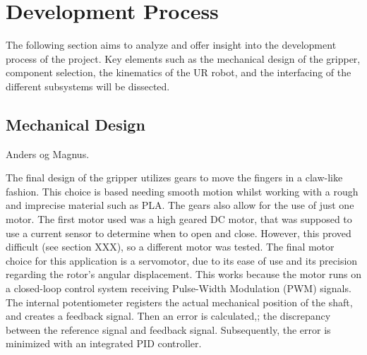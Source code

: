 \section{Development Process}

The following section aims to analyze and offer insight into the development process of the project. Key elements such as the mechanical design of the gripper, component selection, the kinematics of the UR robot, and the interfacing of the different subsystems will be dissected. 

\subsection{Mechanical Design} 
Anders og Magnus.

The final design of the gripper utilizes gears to move the fingers in a claw-like fashion. This choice is based needing smooth motion whilst working with a rough and imprecise material such as PLA. The gears also allow for the use of just one motor. The first motor used was a high geared DC motor, that was supposed to use a current sensor to determine when to open and close. However, this proved difficult (see section XXX), so a different motor was tested. The final motor choice for this application is a servomotor, due to its ease of use and its precision regarding the rotor's angular displacement. This works because the motor runs on a closed-loop control system receiving Pulse-Width Modulation (PWM) signals. The internal potentiometer registers the actual mechanical position of the shaft, and creates a feedback signal. Then an error is calculated,; the discrepancy between the reference signal and feedback signal. Subsequently, the error is minimized with an integrated PID controller.\cite{Servo}  
\\ 

